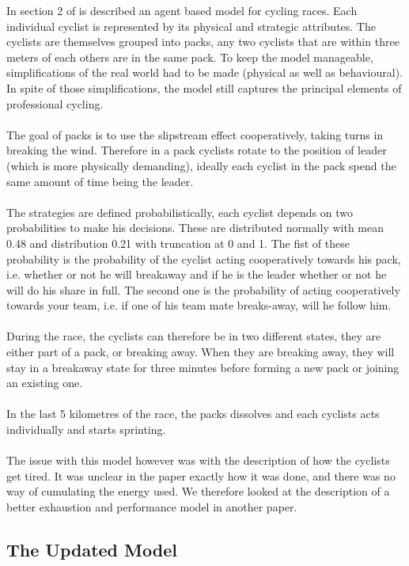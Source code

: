 \documentclass[10pt, a4paper]{report}
\begin{document}
In section 2 of \cite{AgentModel} is described an agent based model for cycling races. Each individual cyclist is represented by its physical and strategic attributes. The cyclists are themselves grouped into packs, any two cyclists that are within three meters of each others are in the same pack. To keep the model manageable, simplifications of the real world had to be made (physical as well as behavioural). In spite of those simplifications, the model still captures the principal elements of professional cycling. \\\\
The goal of packs is to use the slipstream effect cooperatively, taking turns in breaking the wind. Therefore in a pack cyclists rotate to the position of leader (which is more physically demanding), ideally each cyclist in the pack spend the same amount of time being the leader.\\\\
The strategies are defined probabilistically, each cyclist depends on two probabilities to make his decisions. These are distributed normally with mean 0.48 and distribution 0.21 with truncation at 0 and 1. The fist of these probability is the probability of the cyclist acting cooperatively towards his pack, i.e. whether or not he will breakaway and if he is the leader whether or not he will do his share in full. The second one is the probability of acting cooperatively towards your team, i.e. if one of his team mate breaks-away, will he follow him. \\\\
During the race, the cyclists can therefore be in two different states, they are either part of a pack, or breaking away. When they are breaking away, they will stay in a breakaway state for three minutes before forming a new pack or joining an existing one.
\\\\
In the last 5 kilometres of the race, the packs dissolves and each cyclists acts individually and starts sprinting. \\\\
The issue with this model however was with the description of how the cyclists get tired. It was unclear in the paper exactly how it was done, and there was no way of cumulating the energy used. We therefore looked at the description of a better exhaustion and performance model in another paper.

\subsection{The Updated Model}\label{subsec:updmodel}
\end{document}
